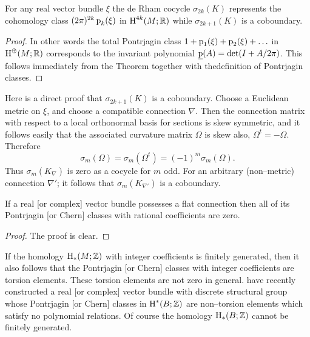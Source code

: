 \documentclass[../main]{subfiles}
\begin{document}
\begin{corollary}
For any real vector bundle $\xi$ the de Rham cocycle $\sigma_{2k}(K)$ represents the cohomology class $(2 \pi)^{2k} \operatorname{p}_k(\xi)$ in $\operatorname{H}^{4k}(M; \mathbb R)$ while $\sigma_{2k + 1}(K)$ is a coboundary.
\end{corollary}

\begin{proof}
In other words the total Pontrjagin class $1 + \operatorname{p}_1(\xi) + \operatorname{p}_2(\xi) + \ldots$ in $\operatorname{H}^\oplus(M; \mathbb R)$ corresponds to the invariant polynomial ${\underline {\operatorname{p}}}(A) = \det(I + A/2\pi)$. This follows immediately from the Theorem together with thedefinition of Pontrjagin classes.
\end{proof}

\begin{remark*}
Here is a direct proof that $\sigma_{2k + 1}(K)$ is a coboundary. Choose a Euclidean metric on $\xi$, and choose a compatible connection $\nabla$. Then the connection matrix with respect to a local orthonormal basis for sections is skew symmetric, and it follows easily that the associated curvature matrix $\Omega$ is skew also, $\Omega^t = -\Omega$. Therefore \[\sigma_m(\Omega) = \sigma_m(\Omega^t) = (-1)^m \sigma_m(\Omega).\] Thus $\sigma_m(K_\nabla)$ is zero as a cocycle for $m$ odd. For an arbitrary (non--metric) connection $\nabla'$; it follows that $\sigma_m(K_{\nabla'})$ is a coboundary.
\end{remark*} 

\begin{corollary}
If a real [or complex] vector bundle possesses a flat connection then all of its Pontrjagin [or Chern] classes with rational coefficients are zero. 
\end{corollary}

\begin{proof}
The proof is clear. 
\end{proof}

\begin{remark*}
If the homology $\operatorname{H}_\ast(M; \mathbb Z)$ with integer coefficients is finitely generated, then it also follows that the Pontrjagin [or Chern] classes with integer coefficients are torsion elements. These torsion elements are not zero in general. \cite{bott-heitsch} have recently constructed a real [or complex] vector bundle with discrete structural group whose Pontrjagin [or Chern] classes in $\operatorname{H}^\ast(B; \mathbb Z)$ are non--torsion elements which satisfy no polynomial relations. Of course the homology $\operatorname{H}_\ast(B; \mathbb Z)$ cannot be finitely generated. 
\end{remark*} 
\end{document}
